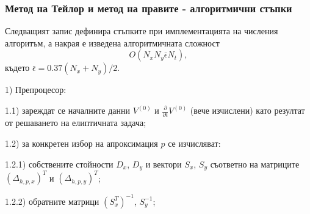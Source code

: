 \documentclass[a4paper]{article}
\theoremstyle{remark}
\begin{document}
\begin{large}
\subsubsection{Метод на Тейлор и метод на правите - алгоритмични стъпки}

Следващият запис дефинира стъпките при имплементацията на числения алгоритъм, а накрая е изведена алгоритмичната сложност
$$ O(N_x N_y \bar \epsilon N_t ), $$
където $\bar\epsilon = 0.37(N_x + N_y)/2$.
\par
1) Препроцесор:
\par
1.1) зареждат се началните данни $V^{(0)}$ и $\frac{\partial}{\partial t} V^{(0)}$ (вече изчислени) като резултат от решаването на елиптичната задача;
\par
1.2) за конкретен избор на апроксимация $p$ се изчисляват:
\par
1.2.1) собствените стойности $D_x$, $D_y$ и вектори $S_x$, $S_y$ съответно на матриците $(\Delta_{h,p,x})^T$ и $(\Delta_{h,p,y})^T$;
\par
1.2.2) обратните матрици $(S_x^T)^{-1}$, $S_y^{-1}$;
\\


\end{large}
\end{document}
